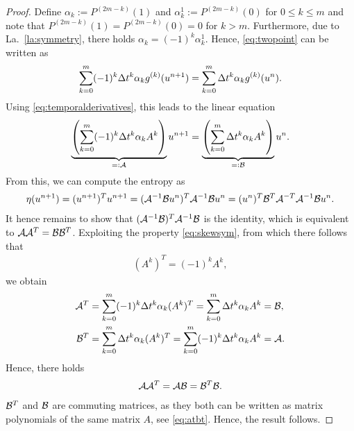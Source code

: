 \documentclass[]{scrartcl}
\numberwithin{equation}{section}
\begin{document}
\begin{proof}
Define $\alpha_k := P^{(2m-k)}(1)$ and $\alpha_k^1 := P^{(2m-k)}(0)$ for $0 \leq k \leq m$ and note that $P^{(2m-k)}(1) = P^{(2m-k)}(0) = 0$ for $k > m$. Furthermore, due to La.~\ref{la:symmetry}, there holds $\alpha_k = (-1)^k \alpha_k^1$.
Hence, \eqref{eq:twopoint} can be written as
%
\begin{align}
 \label{eq:twopointa}
 \sum_{k=0}^{m} (-1)^k \Delta t^k \alpha_k g^{(k)}(u^{n+1})  = \sum_{k=0}^{m} \Delta t^k \alpha_k g^{(k)}(u^{n}).
\end{align}
%
Using \eqref{eq:temporalderivatives}, this leads to the linear equation
%
\begin{align}
 \underbrace{\left(\sum_{k=0}^{m} (-1)^k \Delta t^k \alpha_k A^k\right)}_{=:\mathcal{A}}u^{n+1}   = \underbrace{\left(\sum_{k=0}^{m} \Delta t^k \alpha_k A^k\right)}_{=:\mathcal B} u^n.
\end{align}
%
From this, we can compute the entropy as
%
\begin{align*}
 \eta(u^{n+1}) = (u^{n+1})^T u^{n+1} = (\mathcal{A}^{-1} \mathcal{B} u^n)^T \mathcal{A}^{-1} \mathcal{B} u^n = (u^n)^T \mathcal{B}^T \mathcal{A}^{-T} \mathcal{A}^{-1} \mathcal{B} u^n.
\end{align*}
%
It hence remains to show that $(\mathcal{A}^{-1} \mathcal{B})^{T} \mathcal{A}^{-1} \mathcal{B}$ is the identity, which is equivalent to $\mathcal{A} \mathcal{A}^T = \mathcal{B} \mathcal{B}^T$. Exploiting the property \eqref{eq:skewsym}, from which there follows that
%
\begin{align*}
 (A^k)^T = (-1)^k A^k,
\end{align*}
%
we obtain
%
\begin{align}
\label{eq:atbt}
 \begin{split}
 \mathcal{A}^T &= \sum_{k=0}^{m} (-1)^k \Delta t^k \alpha_k (A^k)^T = \sum_{k=0}^{m} \Delta t^k \alpha_k A^k = \mathcal{B}, \\
 \mathcal{B}^T &= \sum_{k=0}^{m} \Delta t^k \alpha_k (A^k)^T = \sum_{k=0}^{m} (-1)^k \Delta t^k \alpha_k A^k = \mathcal{A}.
 \end{split}
\end{align}
Hence, there holds
\begin{align*}
 \mathcal{A} \mathcal{A}^T = \mathcal{A} \mathcal{B} = \mathcal{B}^T \mathcal{B}.
\end{align*}
%
$\mathcal{B}^T$ and $\mathcal{B}$ are commuting matrices, as they both can be written as matrix polynomials of the same matrix $A$, see \eqref{eq:atbt}. Hence, the result follows.
\end{proof}

\newpage
\end{document}
